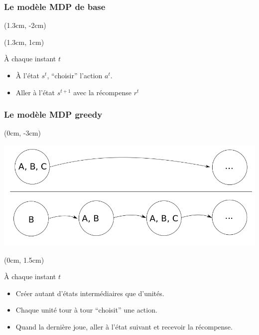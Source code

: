 \documentclass[smaller]{beamer}
\begin{document}
\begin{frame}
  \frametitle{Le modèle MDP de base}

  \begin{textblock*}{8.25cm}(1.3cm, -2cm)
    \centerline{\def\svgwidth{\columnwidth}}
  \end{textblock*}

  \begin{textblock*}{8.25cm}(1.3cm, 1cm)
    \begin{block}{À chaque instant $t$}
      \begin{itemize}
      \item À l'état $s^t$, ``choisir'' l'action $a^t$.
      \item Aller à l'état $s^{t+1}$ avec la récompense $r^t$
      \end{itemize}
    \end{block}
  \end{textblock*}


\end{frame}


\begin{frame}
  \frametitle{Le modèle MDP greedy}

  \begin{textblock*}{11cm}(0cm, -3cm)
    \centerline{\includegraphics[width=0.9\linewidth]{./figs/chaine_markov_greedy.png}}
  \end{textblock*}
  
  \begin{textblock*}{11cm}(0cm, 1.5cm)
    \begin{exampleblock}{À chaque instant $t$}
      \begin{itemize}
      \item Créer autant d'états intermédiaires que d'unités.
      \item Chaque unité tour à tour ``choisit'' une action.
      \item Quand la dernière joue, aller à l'état suivant et recevoir
        la récompense.
      \end{itemize}
    \end{exampleblock}
  \end{textblock*}

\end{frame}
\end{document}
